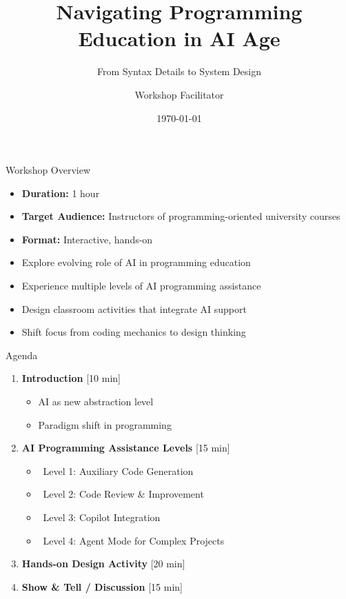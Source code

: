 \documentclass{beamer}
\title{Navigating Programming Education in AI Age}
\subtitle{From Syntax Details to System Design}
\author{Workshop Facilitator}
\date{\today}
\institute{Faculty Workshop}
\begin{document}
\begin{frame}
    \titlepage
\end{frame}

\begin{frame}{Workshop Overview}
    \begin{itemize}
        \item \textbf{Duration:} 1 hour
        \item \textbf{Target Audience:} Instructors of programming-oriented university courses
        \item \textbf{Format:} Interactive, hands-on
    \end{itemize}
    
    \begin{tcolorbox}[colback=myblue!10,colframe=myblue,title=Workshop Objectives]
        \begin{itemize}
            \item Explore evolving role of AI in programming education
            \item Experience multiple levels of AI programming assistance
            \item Design classroom activities that integrate AI support
            \item Shift focus from coding mechanics to design thinking 
        \end{itemize}
    \end{tcolorbox}
\end{frame}

\begin{frame}{Agenda}
    \begin{enumerate}
        \item \textbf{Introduction} [10 min]
            \begin{itemize}
                \item AI as new abstraction level
                \item Paradigm shift in programming 
            \end{itemize}
        
        \item \textbf{AI Programming Assistance Levels} [15 min]
            \begin{itemize}
                \item \faRocket~Level 1: Auxiliary Code Generation
                \item \faSearch~Level 2: Code Review \& Improvement
                \item \faBrain~Level 3: Copilot Integration
                \item \faPuzzlePiece~Level 4: Agent Mode for Complex Projects
            \end{itemize}
        
        \item \textbf{Hands-on Design Activity} [20 min]
        
        \item \textbf{Show \& Tell / Discussion} [15 min]
    \end{enumerate}
\end{frame}
\end{document}
